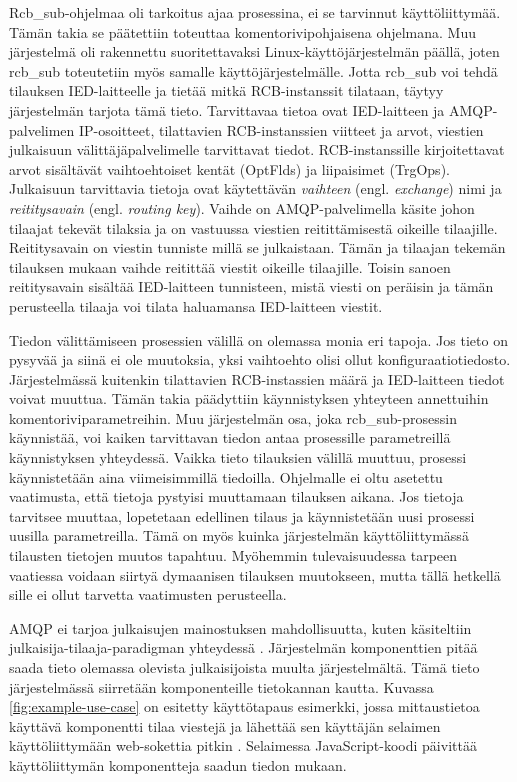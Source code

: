 Rcb\_sub-ohjelmaa oli tarkoitus ajaa prosessina, ei se tarvinnut käyttöliittymää. Tämän takia se päätettiin toteuttaa komentorivipohjaisena ohjelmana. Muu järjestelmä oli rakennettu suoritettavaksi Linux-käyttöjärjestelmän päällä, joten rcb\_sub toteutetiin myös samalle käyttöjärjestelmälle. Jotta rcb\_sub voi tehdä tilauksen IED-laitteelle ja tietää mitkä RCB-instanssit tilataan, täytyy järjestelmän tarjota tämä tieto. Tarvittavaa tietoa ovat IED-laitteen ja AMQP-palvelimen IP-osoitteet, tilattavien RCB-instanssien viitteet ja arvot, viestien julkaisuun välittäjäpalvelimelle tarvittavat tiedot. RCB-instanssille kirjoitettavat arvot sisältävät vaihtoehtoiset kentät (OptFlds) ja liipaisimet (TrgOps). Julkaisuun tarvittavia tietoja ovat käytettävän \emph{vaihteen} (engl. \emph{exchange}) nimi ja \emph{reititysavain} (engl. \emph{routing key}). Vaihde on AMQP-palvelimella käsite johon tilaajat tekevät tilaksia ja on vastuussa viestien reitittämisestä oikeille tilaajille. Reititysavain on viestin tunniste millä se julkaistaan. Tämän ja tilaajan tekemän tilauksen mukaan vaihde reitittää viestit oikeille tilaajille. Toisin sanoen reititysavain sisältää IED-laitteen tunnisteen, mistä viesti on peräisin ja tämän perusteella tilaaja voi tilata haluamansa IED-laitteen viestit.

Tiedon välittämiseen prosessien välillä on olemassa monia eri tapoja. Jos tieto on pysyvää ja siinä ei ole muutoksia, yksi vaihtoehto olisi ollut konfiguraatiotiedosto. Järjestelmässä kuitenkin tilattavien RCB-instassien määrä ja IED-laitteen tiedot voivat muuttua. Tämän takia päädyttiin käynnistyksen yhteyteen annettuihin komentoriviparametreihin. Muu järjestelmän osa, joka rcb\_sub-prosessin käynnistää, voi kaiken tarvittavan tiedon antaa prosessille parametreillä käynnistyksen yhteydessä. Vaikka tieto tilauksien välillä muuttuu, prosessi käynnistetään aina viimeisimmillä tiedoilla. Ohjelmalle ei oltu asetettu vaatimusta, että tietoja pystyisi muuttamaan tilauksen aikana. Jos tietoja tarvitsee muuttaa, lopetetaan edellinen tilaus ja käynnistetään uusi prosessi uusilla parametreilla. Tämä on myös kuinka järjestelmän käyttöliittymässä tilausten tietojen muutos tapahtuu. Myöhemmin tulevaisuudessa tarpeen vaatiessa voidaan siirtyä dymaanisen tilauksen muutokseen, mutta tällä hetkellä sille ei ollut tarvetta vaatimusten perusteella.

AMQP ei tarjoa julkaisujen mainostuksen mahdollisuutta, kuten käsiteltiin julkaisija-tilaaja-paradigman yhteydessä \cite{AMQP-specification}. Järjestelmän komponenttien pitää saada tieto olemassa olevista julkaisijoista muulta järjestelmältä. Tämä tieto järjestelmässä siirretään komponenteille tietokannan kautta. Kuvassa \ref{fig:example-use-case} on esitetty käyttötapaus esimerkki, jossa mittaustietoa käyttävä komponentti tilaa viestejä ja lähettää sen käyttäjän selaimen käyttöliittymään web-sokettia pitkin \cite{websocket}. Selaimessa JavaScript-koodi päivittää käyttöliittymän komponentteja saadun tiedon mukaan.

